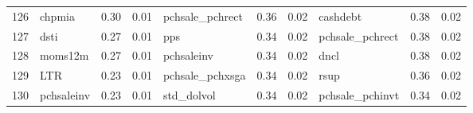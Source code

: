\documentclass[12pt]{article}
\begin{document}
\begin{landscape}
\begin{footnotesize}
\begin{longtable}{l|lcc|lcc|lcc}
			126                   & chpmia                      & 0.30                                                                                 & 0.01                            & pchsale\_pchrect            & 0.36                                                                                 & 0.02                            & cashdebt                    & 0.38                                                                                 & 0.02                           \\
			127                   & dsti                        & 0.27                                                                                 & 0.01                            & pps                         & 0.34                                                                                 & 0.02                            & pchsale\_pchrect            & 0.38                                                                                 & 0.02                           \\
			128                   & moms12m                     & 0.27                                                                                 & 0.01                            & pchsaleinv                  & 0.34                                                                                 & 0.02                            & dncl                        & 0.38                                                                                 & 0.02                           \\
			129                   & LTR                         & 0.23                                                                                 & 0.01                            & pchsale\_pchxsga            & 0.34                                                                                 & 0.02                            & rsup                        & 0.36                                                                                 & 0.02                           \\
			130                   & pchsaleinv                  & 0.23                                                                                 & 0.01                            & std\_dolvol                 & 0.34                                                                                 & 0.02                            & pchsale\_pchinvt            & 0.34                                                                                 & 0.02                           \\

\end{longtable}
\end{footnotesize}
\end{landscape}
\end{document}

